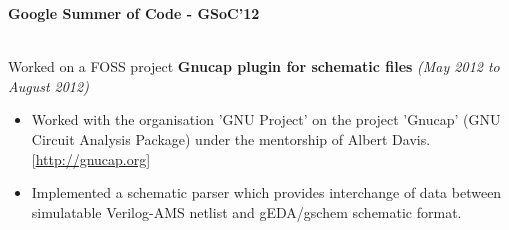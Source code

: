 \documentclass[a4paper,11pt]{article}
\newcommand{\isep}{-2 pt}
\newcommand{\resheading}[1]{{\small \colorbox{mygrey}{\begin{minipage}{0.975\textwidth}{\textbf{#1 \vphantom{p\^{E}}}}\end{minipage}}}}
\begin{document}
\resheading{\textbf{\large Google Summer of Code - GSoC'12}} \\

\hspace{1mm} Worked on a FOSS project \textbf{Gnucap plugin for schematic files} \hfill \emph{(May 2012 to August 2012)} \\[-0.6cm]
    \begin{itemize}
        \item Worked with the organisation 'GNU Project' on the project 'Gnucap' (GNU Circuit Analysis Package) under the mentorship of Albert Davis. \hfill  [\url{http://gnucap.org}] \\[-0.6cm]
        \item Implemented a schematic parser which provides interchange of data between simulatable Verilog-AMS netlist and gEDA/gschem schematic format.
    \end{itemize}
\end{document}
